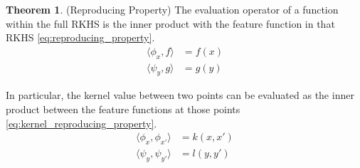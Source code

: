 \documentclass[twoside]{article} \usepackage{aistats2017}
\theoremstyle{definition}
\newtheorem{theorem}{Theorem}[section]
\newcommand{\inner}[2]{{\langle #1, #2 \rangle}}
\begin{document}
		\begin{theorem} \label{thm:reproducing_property}
			(Reproducing Property)
			The evaluation operator of a function within the full RKHS is the inner product with the feature function in that RKHS \eqref{eq:reproducing_property}.
			\begin{equation}
			\begin{aligned}
				\inner{\phi_{x}}{f} &= f(x) \\
				\inner{\psi_{y}}{g} &= g(y)
			\label{eq:reproducing_property}
			\end{aligned}
			\end{equation}
			
			In particular, the kernel value between two points can be evaluated as the inner product between the feature functions at those points \eqref{eq:kernel_reproducing_property}.
			\begin{equation}
			\begin{aligned}
				\inner{\phi_{x}}{\phi_{x'}} &= k(x, x') \\
				\inner{\psi_{y}}{\psi_{y'}} &= l(y, y')
			\label{eq:kernel_reproducing_property}
			\end{aligned}
			\end{equation}
		\end{theorem}
	
\end{document}
